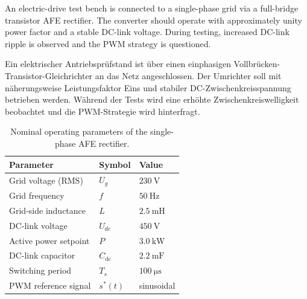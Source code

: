 

An electric-drive test bench is connected to a single-phase grid via a full-bridge transistor AFE rectifier.
The converter should operate with approximately unity power factor and a stable DC-link voltage.
During testing, increased DC-link ripple is observed and the PWM strategy is questioned.

\begin{germanblock}
    Ein elektrischer Antriebsprüfstand ist über einen einphasigen Vollbrücken-Transistor-Gleichrichter
    an das Netz angeschlossen. Der Umrichter soll mit näherungsweise Leistungsfaktor Eins und stabiler
    DC-Zwischenkreisspannung betrieben werden. Während der Tests wird eine erhöhte Zwischenkreiswelligkeit
    beobachtet und die PWM-Strategie wird hinterfragt.
\end{germanblock}


\begin{table}[ht]
    \centering
    \begin{tabular}{lll}
        \toprule
        Parameter             & Symbol            & Value                     \\
        \midrule
        Grid voltage (RMS)    & $U_g$             & $\SI{230}{\volt}$         \\
        Grid frequency        & $f$               & $\SI{50}{\hertz}$         \\
        Grid-side inductance  & $L$               & $\SI{2.5}{\milli\henry}$  \\
        DC-link voltage       & $U_{dc}$          & $\SI{450}{\volt}$         \\
        Active power setpoint & $P$               & $\SI{3.0}{\kilo\watt}$    \\
        DC-link capacitor     & $C_{\mathrm{dc}}$ & $\SI{2.2}{\milli\farad}$  \\
        Switching period      & $T_s$             & $\SI{100}{\micro\second}$ \\
        PWM reference signal  & $s^*(t)$          & sinusoidal                \\
        \bottomrule
    \end{tabular}
    \caption{Nominal operating parameters of the single-phase AFE rectifier.}
    \label{tab:task04_parameters}
\end{table}


